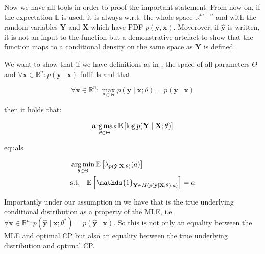 Now we have all tools in order to proof the important statement. From now on, if the expectation $\mathbb{E}$ is used, it is always w.r.t. the whole space $\mathbb{R}^{m+n}$ and with the random variables $\mathbf{Y}$ and $\mathbf{X}$ which have PDF $p(\mathbf{y}, \mathbf{x})$. Moverover, if $\mathbf{\hat{y}}$ is written, it is not an input to the function but a demonstrative artefact to show that the function maps to a conditional density on the same space as $\mathbf{Y}$ is defined.

\begin{theorem}\label{thm:optimal_cp}
    We want to show that if we have definitions as in , the space of all parameters $\Theta$ and $\forall \mathbf{x}\in\mathbb{R}^n: p(\mathbf{y}\mid \mathbf{x})$ fullfills  and that

    \begin{equation}
        \forall \mathbf{x}\in \mathbb{R}^n: \max_{\theta \in \Theta} p(\mathbf{y} \mid \mathbf{x}; \theta) = p(\mathbf{y} \mid \mathbf{x})
        \label{eq:assn_mle_is_true}
    \end{equation}

    then it holds that:

    \begin{equation}
        \operatorname*{arg\,max}_{\theta \in \Theta}  \mathbb{E} \left[ \log
            p(\mathbf{Y} \mid \mathbf{X}; \theta) \right]
        \label{eq:maximum_log_likelihood}
    \end{equation}

    equals

    \begin{align}
         & \argmin_{\theta \in \Theta} \mathbb{E} \left[
            \lambda_{p(\mathbf{\hat{y}}\mid\mathbf{X}; \theta)}( a)
        \right]                                          \\
         & \text{s.t.} \quad \mathbb{E} \left[
        \mathds{1}_{\mathbf{Y} \in
        H(p(\mathbf{\hat{y}} \mid \mathbf{X}; \theta), a)} \right]
        = a
    \end{align}

\end{theorem}

Importantly under our assumption in  we have that  is the true underlying conditional distribution as a property of the MLE, i.e. $\forall \mathbf{x}\in\mathbb{R}^n: p(\mathbf{\hat{y}}\mid\mathbf{x}; \theta^*) = p(\mathbf{\hat{y}}\mid\mathbf{x})$. So this is not only an equality between the MLE and optimal CP but also an equality between the true underlying distribution and optimal CP.

